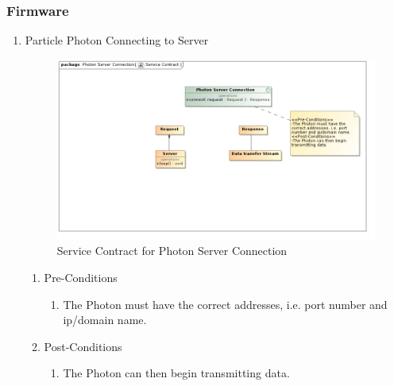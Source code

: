 \documentclass{article}
\begin{document}
	\subsubsection{Firmware}
	\begin{enumerate}
		\item	Particle Photon Connecting to Server
		
		\begin{figure}[H]
			\includegraphics[width=\textwidth]{images/PhotonConnectionServiceContract.jpg}
			\caption{Service Contract for Photon Server Connection \label{overflow}}
		\end{figure}
			
		\begin{enumerate}
			\item  Pre-Conditions
			\begin{enumerate}
				\item	The Photon must have the correct addresses, i.e. port number and ip/domain name.
			\end{enumerate}
			\item  Post-Conditions		
			\begin{enumerate}
				\item	The Photon can then begin transmitting data.
			\end{enumerate}
		\end{enumerate}
	\end{enumerate}
\end{document}

